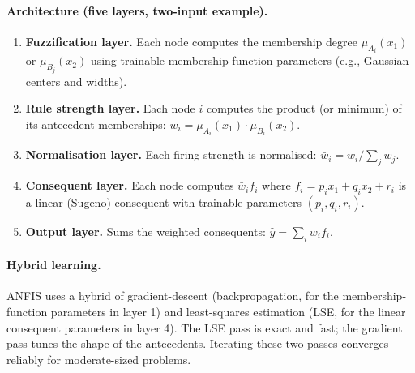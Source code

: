 \paragraph{Architecture (five layers, two-input example).}
\begin{enumerate}
  \item \textbf{Fuzzification layer.} Each node computes the membership degree \(\mu_{A_i}(x_1)\) or \(\mu_{B_j}(x_2)\) using trainable membership function parameters (e.g., Gaussian centers and widths).
  \item \textbf{Rule strength layer.} Each node \(i\) computes the product (or minimum) of its antecedent memberships: \(w_i = \mu_{A_i}(x_1) \cdot \mu_{B_i}(x_2)\).
  \item \textbf{Normalisation layer.} Each firing strength is normalised: \(\bar{w}_i = w_i / \sum_j w_j\).
  \item \textbf{Consequent layer.} Each node computes \(\bar{w}_i f_i\) where \(f_i = p_i x_1 + q_i x_2 + r_i\) is a linear (Sugeno) consequent with trainable parameters \((p_i, q_i, r_i)\).
  \item \textbf{Output layer.} Sums the weighted consequents: \(\hat{y} = \sum_i \bar{w}_i f_i\).
\end{enumerate}

\paragraph{Hybrid learning.}
ANFIS uses a hybrid of gradient-descent (backpropagation, for the membership-function parameters in layer 1) and least-squares estimation (LSE, for the linear consequent parameters in layer 4). The LSE pass is exact and fast; the gradient pass tunes the shape of the antecedents. Iterating these two passes converges reliably for moderate-sized problems.

